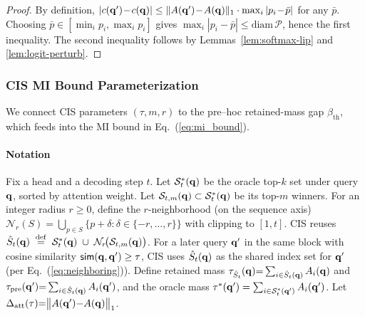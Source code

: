 \begin{proof}
By definition,
$|c(\mathbf{q}')\!-\!c(\mathbf{q})|\le \|A(\mathbf{q}')\!-\!A(\mathbf{q})\|_1 \cdot \max_i |p_i\!-\!\bar p|$ for any $\bar p$.
Choosing $\bar p\in[\min_i p_i,\max_i p_i]$ gives $\max_i|p_i-\bar p|\le \mathrm{diam}\,\mathcal{P}$, hence the first inequality. The second inequality follows by Lemmas~\ref{lem:softmax-lip} and \ref{lem:logit-perturb}.
\end{proof}

\subsubsection{CIS MI Bound Parameterization}
\label{sec:cis-mi-parameterization}

We connect CIS parameters $(\tau,m,r)$ to the pre–hoc retained-mass gap $\beta_{\mathrm{th}}$, which
feeds into the MI bound in Eq.~(\ref{eq:mi_bound}).

\paragraph{Notation}
Fix a head and a decoding step $t$. Let $\mathcal{S}_t^\ast(\mathbf{q})$ be the oracle top-$k$ set under query $\mathbf{q}$,
sorted by attention weight. Let $\mathcal{S}_{t,m}(\mathbf{q})\subset\mathcal{S}_t^\ast(\mathbf{q})$ be its top-$m$ winners.
For an integer radius $r\ge 0$, define the $r$-neighborhood (on the sequence axis)
$\mathcal{N}_r(S)=\bigcup_{p\in S}\{p+\delta:\delta\in\{-r,\dots,r\}\}$ with clipping to $[1,t]$.
CIS reuses $\hat S_t(\mathbf{q}) \;\stackrel{\mathrm{def}}{=}\; \mathcal{S}_t^\ast(\mathbf{q})\;\cup\;\mathcal{N}_r\!\big(\mathcal{S}_{t,m}(\mathbf{q})\big)$. For a later query $\mathbf{q}'$ in the same block with cosine similarity $\mathsf{sim}(\mathbf{q},\mathbf{q}')\ge \tau$, CIS uses $\hat S_t(\mathbf{q})$ as the shared index set for $\mathbf{q}'$ (per Eq.~(\ref{eq:neighboring})). Define retained mass
$\tau_{\hat S_t}(\mathbf{q}){=}\sum_{i{\in}\hat S_t(\mathbf{q})}A_i(\mathbf{q})$ and $\tau_{\mathrm{pre}}(\mathbf{q}'){=}\sum_{i\in \hat S_t(\mathbf{q})}A_i(\mathbf{q}')$, and the oracle mass $\tau^\ast(\mathbf{q}') = \sum_{i\in \mathcal{S}_t^\ast(\mathbf{q}')}A_i(\mathbf{q}')$. Let $\Delta_{\mathrm{att}}(\tau)
{=} \big\|A(\mathbf{q}'){-}A(\mathbf{q})\big\|_1$.

